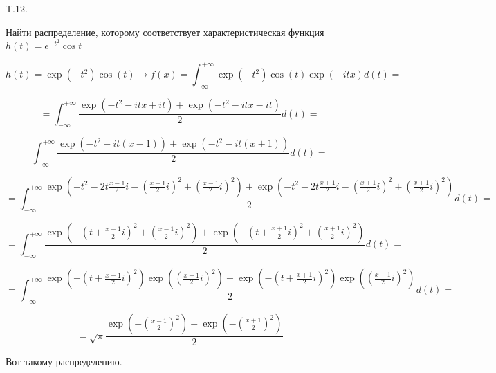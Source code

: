 \documentclass[a4paper,12pt]{article} %
\begin{document}
\begin{example} T.12. 

Найти распределение, которому соответствует характеристическая функция $h(t)=e^{-t^{2}} \cos t$



$$
h(t)=\exp \left(-t^{2}\right) \cos (t) \rightarrow f(x)=\int_{-\infty}^{+\infty} \exp \left(-t^{2}\right) \cos (t) \exp (-i t x) d(t)=
$$


$$
=\int_{-\infty}^{+\infty} \frac{\exp \left(-t^{2}-i t x+i t\right)+\exp \left(-t^{2}-i t x-i t\right)}{2} d(t)
=
$$


\[ \int_{-\infty}^{+\infty} \frac{\exp \left(-t^{2}-i t(x-1)\right)+\exp \left(-t^{2}-i t(x+1)\right)}{2} d(t)=
\]



$$
=\int_{-\infty}^{+\infty}
\frac{ 
	\exp \left(-t^{2}-2 t \frac{x-1}{2} i-\left(\frac{x-1}{2} i\right)^{2}
	+\left(\frac{x-1}{2} i\right)^{2}\right)
	+
	\exp \left(-t^{2}-2 t \frac{x+1}{2} i-\left(\frac{x+1}{2} i\right)^{2}+\left(\frac{x+1}{2} i\right)^{2}\right)
}{2} d(t)=
$$


$$
=\int_{-\infty}^{+\infty} \frac{\exp \left(-\left(t+\frac{x-1}{2} i\right)^{2}+\left(\frac{x-1}{2} i\right)^{2}\right)+\exp \left(-\left(t+\frac{x+1}{2} i\right)^{2}+\left(\frac{x+1}{2} i\right)^{2}\right)}{2} d(t)=
$$




$$
=\int_{-\infty}^{+\infty} \frac{\exp \left(-\left(t+\frac{x-1}{2} i\right)^{2}\right) \exp \left(\left(\frac{x-1}{2} i\right)^{2}\right)+\exp \left(-\left(t+\frac{x+1}{2} i\right)^{2}\right) \exp \left(\left(\frac{x+1}{2} i\right)^{2}\right)}{2} d(t)=
$$




$$
=\sqrt{\pi} \frac{\exp \left(-\left(\frac{x-1}{2}\right)^{2}\right)+\exp \left(-\left(\frac{x+1}{2}\right)^{2}\right)}{2}
$$



Вот такому распределению.




\end{example}
\end{document}

